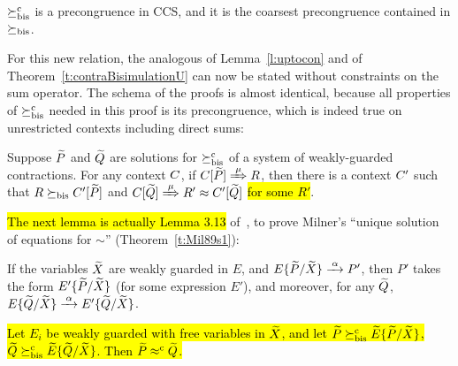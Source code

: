 \begin{theorem}
\label{t:rcontrPrecongruence}
$\mathrel{\succeq^{\rm{c}}_{\rm{bis}}}$ is a precongruence in CCS, and it is the coarsest
precongruence contained in $\mathrel{\succeq_{\rm{bis}}}$.
\end{theorem}  

For this new relation, the analogous of Lemma~\ref{l:uptocon} and of
Theorem~\ref{t:contraBisimulationU} can now be stated without
constraints on the sum operator.
The schema of the proofs is almost identical, because all 
properties of $\mathrel{\succeq^{\rm{c}}_{\rm{bis}}}$ needed in this proof is its precongruence, which is
indeed true on unrestricted contexts including direct sums:
\begin{lemma}
\label{l:ruptocon}
Suppose $\widetilde P$ and $\widetilde Q$ are solutions  for $\mathrel{\succeq^{\rm{c}}_{\rm{bis}}}$ 
 of a system of weakly-guarded contractions.
For any context $C$, 
if  $\ct{\til P}\Arr{\mu}  R$,
 then there is a context $C'$
such that $R \mathrel{\succeq_{\rm{bis}}} C' [\widetilde P]$ and  $\ct{\til Q} \Arr{\mu} R'
 \wb \ctp{\til Q}$ \hl{for some $R'$}.
\end{lemma}

\hl{The next lemma is actually Lemma 3.13} of~\citep[p.~102]{Mil89},  to prove Milner's ``unique solution of equations for
$\sim$'' (Theorem~\ref{t:Mil89s1}):
\begin{lemma}
  \label{lem:milner313}
  If the variables ${\widetilde X}$ are weakly guarded in $E$, and $E\{\til
  P/\til X\} \arr{\alpha} P'$, then $P'$ takes the form $E'\{\widetilde
  P/\widetilde X\}$ (for some expression $E'$), and moreover, for any ${\widetilde Q}$,
  $E\{\til Q/\til X\} \arr{\alpha} E'\{\til Q/\til X\}$.
\end{lemma}

\begin{theorem}
\label{t:rcontraBisimulationU}
\hl{Let $E_i$ be weakly guarded with free variables in $\widetilde X$,
and let $\widetilde P \mathrel{\succeq^{\rm{c}}_{\rm{bis}}} \widetilde E\{\widetilde P/\widetilde X\}$,
    $\widetilde Q \mathrel{\succeq^{\rm{c}}_{\rm{bis}}} \widetilde E\{\widetilde Q/\widetilde X\}$. Then $\widetilde P \mathrel{\approx^{\rm{c}}} \widetilde Q$.}
\end{theorem}

